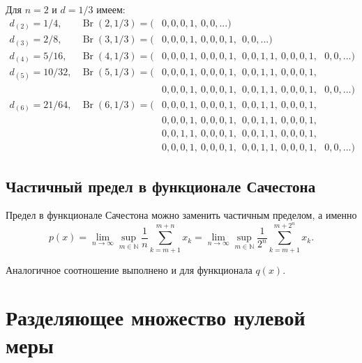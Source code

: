 \begin{example}
	Для $n=2$ и $d=1/3$ имеем:
	\begin{equation*}
		\begin{array}{lll}
			d_{(2)} = 1/4, &
			\operatorname{Br}(2,1/3) = (&0,0,0,1, \ 0,0,...)
			\\
			d_{(3)} = 2/8, &
			\operatorname{Br}(3,1/3) = (&0,0,0,1, \ 0,0,0,1, \ \   0,0,...)
			\\
			d_{(4)} = 5/16, &
			\operatorname{Br}(4,1/3) = (&0,0,0,1, \ 0,0,0,1, \ \   0,0,1,1, \ 0,0,0,1, \ \ \  0,0,...)
			\\
			d_{(5)} = 10/32, &
			\operatorname{Br}(5,1/3) = (&
			                             0,0,0,1, \ 0,0,0,1, \ \   0,0,1,1, \ 0,0,0,1,\\&
			                           & 0,0,0,1, \ 0,0,0,1, \ \   0,0,1,1, \ 0,0,0,1,
			\ \ \ 0,0,...)
			\\
			d_{(6)} = 21/64, &
			\operatorname{Br}(6,1/3) = (&
			                             0,0,0,1, \ 0,0,0,1, \ \   0,0,1,1, \ 0,0,0,1,\\&
			                           & 0,0,0,1, \ 0,0,0,1, \ \   0,0,1,1, \ 0,0,0,1,\\&
			                           & 0,0,1,1, \ 0,0,0,1, \ \   0,0,1,1, \ 0,0,0,1,\\&
			                           & 0,0,0,1, \ 0,0,0,1, \ \   0,0,1,1, \ 0,0,0,1,
			\ \ \ 0,0,...)
		\end{array}
	\end{equation*}
\end{example}

\subsection{Частичный предел в функционале Сачестона}

\begin{proposition}
	\label{prop:Sucheston_partial_limit}
	Предел в функционале Сачестона можно заменить частичным пределом, а именно
	\begin{equation*}
		p(x) = \lim_{n\to\infty} \sup_{m\in\mathbb{N}}  \frac{1}{n} \sum_{k=m+1}^{m+n} x_k
		= \lim_{n\to\infty} \sup_{m\in\mathbb{N}}  \frac{1}{2^n} \sum_{k=m+1}^{m+2^n} x_k
		.
	\end{equation*}
\end{proposition}
Аналогичное соотношение выполнено и для функционала $q(x)$.

\section{Разделяющее множество нулевой меры}

